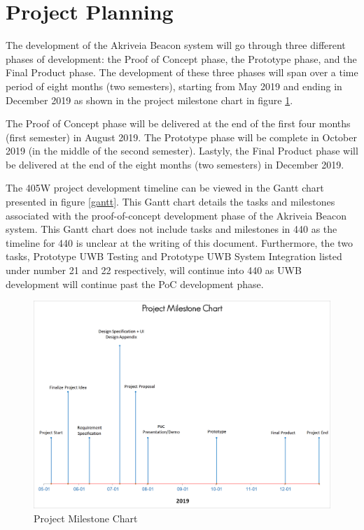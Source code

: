 

\setcounter{section}{4}
\section{Project Planning}
\bigskip

The development of the Akriveia Beacon system will go through three different phases of development: the Proof of Concept phase, the Prototype phase, and the Final Product phase. The development of these three phases will span over a time period of  eight months (two semesters), starting from May 2019 and ending in December 2019 as shown in the project milestone chart in figure \ref{mile}. 

\bigskip
The Proof of Concept phase will be delivered at the end of the first four months (first semester) in August 2019. The Prototype  phase will be complete in October 2019 (in the middle of the second semester). Lastyly, the Final Product phase will be delivered at the end of the eight months (two semesters) in December 2019. 

\bigskip
The 405W project development timeline can be viewed in the Gantt chart presented in figure \ref{gantt}. This Gantt chart details the tasks and milestones associated with the proof-of-concept development phase of the Akriveia Beacon system. This Gantt chart does not include tasks and milestones in 440 as the timeline for 440 is unclear at the writing of this document. Furthermore, the two tasks, Prototype UWB Testing and Prototype UWB System Integration listed under number 21 and 22 respectively, will continue into 440 as UWB development will continue past the PoC development phase.

\medskip
\begin{figure}[H]
\centering
    \includegraphics[width=\linewidth]{./images/mile.png}
    \caption{Project Milestone Chart}
    \label{mile}
\end{figure}

